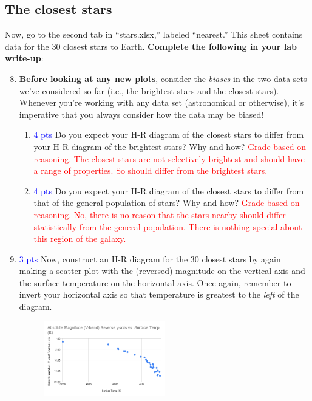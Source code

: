 \documentclass[11pt]{article}
\begin{document}
\subsection{The closest stars}
Now, go to the second tab in ``stars.xlsx,'' labeled ``nearest.'' This sheet contains data for the 30 closest stars to Earth. \textbf{Complete the following in your lab write-up}:
\begin{enumerate}
\setcounter{enumi}{7}

    \item \textbf{Before looking at any new plots}, consider the \emph{biases} in the two data sets we've considered so far (i.e., the brightest stars and the closest stars). Whenever you're working with any data set (astronomical or otherwise), it's imperative that you always consider how the data may be biased!
    \begin{enumerate}
        \item \textcolor{blue}{4 pts} Do you expect your H-R diagram of the closest stars to differ from your H-R diagram of the brightest stars? Why and how?
        \textcolor{red}{Grade based on reasoning. The closest stars are not selectively brightest and should have a range of properties. So should differ from the brightest stars.}
        
        \item \textcolor{blue}{4 pts} Do you expect your H-R diagram of the closest stars to differ from that of the general population of stars? Why and how?
        \textcolor{red}{Grade based on reasoning.  No, there is no reason that the stars nearby should differ statistically from the general population. There is nothing special about this region of the galaxy.}
    \end{enumerate}
    
    \item \textcolor{blue}{3 pts} Now, construct an H-R diagram for the 30 closest stars by again making a scatter plot with the (reversed) magnitude on the vertical axis and the surface temperature on the horizontal axis. Once again, remember to invert your horizontal axis so that temperature is greatest to the \emph{left} of the diagram.

    \begin{figure}[h!]
        \centering
        \includegraphics[width=0.5\textwidth]{Images/mag - nearest.png}
        \label{fig:my_label}
    \end{figure}
    

\end{enumerate}
\end{document}
